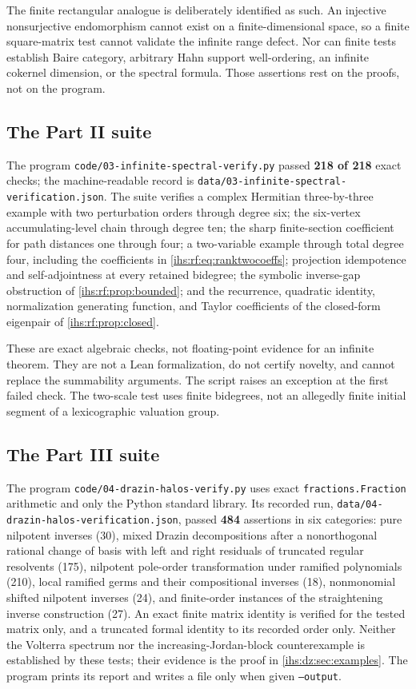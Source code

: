 \documentclass[11pt,a4paper]{article}
\numberwithin{equation}{section}
\theoremstyle{definition}
\theoremstyle{remark}
\begin{document}
The finite rectangular analogue is deliberately identified as such. An
injective nonsurjective endomorphism cannot exist on a finite-dimensional
space, so a finite square-matrix test cannot validate the infinite range
defect. Nor can finite tests establish Baire category, arbitrary Hahn
support well-ordering, an infinite cokernel dimension, or the spectral
formula. Those assertions rest on the proofs, not on the program.

\subsection{The Part II suite}\label{ihs:sec:checkstwo}
The program \texttt{code/03-infinite-spectral-verify.py} passed
\textbf{218 of 218} exact checks; the machine-readable record is
\texttt{data/03-infinite-spectral-verification.json}. The suite verifies a
complex Hermitian three-by-three example with two perturbation orders
through degree six; the six-vertex accumulating-level chain through degree
ten; the sharp finite-section coefficient for path distances one through
four; a two-variable example through total degree four, including the
coefficients in \eqref{ihs:rf:eq:ranktwocoeffs}; projection idempotence and
self-adjointness at every retained bidegree; the symbolic inverse-gap
obstruction of \cref{ihs:rf:prop:bounded}; and the recurrence, quadratic
identity, normalization generating function, and Taylor coefficients of the
closed-form eigenpair of \cref{ihs:rf:prop:closed}.

These are exact algebraic checks, not floating-point evidence for an
infinite theorem. They are not a Lean formalization, do not certify novelty,
and cannot replace the summability arguments. The script raises an exception
at the first failed check. The two-scale test uses finite bidegrees, not an
allegedly finite initial segment of a lexicographic valuation group.

\subsection{The Part III suite}\label{ihs:sec:checksthree}
The program \texttt{code/04-drazin-halos-verify.py} uses exact
\texttt{fractions.Fraction} arithmetic and only the Python standard library.
Its recorded run, \nolinkurl{data/04-drazin-halos-verification.json}, passed
\textbf{484} assertions in six categories: pure nilpotent inverses (30),
mixed Drazin decompositions after a nonorthogonal rational change of basis
with left and right residuals of truncated regular resolvents (175),
nilpotent pole-order transformation under ramified polynomials (210), local
ramified germs and their compositional inverses (18), nonmonomial shifted
nilpotent inverses (24), and finite-order instances of the straightening
inverse construction (27). An exact finite matrix identity is verified for
the tested matrix only, and a truncated formal identity to its recorded
order only. Neither the Volterra spectrum nor the increasing-Jordan-block
counterexample is established by these tests; their evidence is the proof in
\cref{ihs:dz:sec:examples}. The program prints its report and writes a file
only when given \texttt{--output}.
\end{document}
